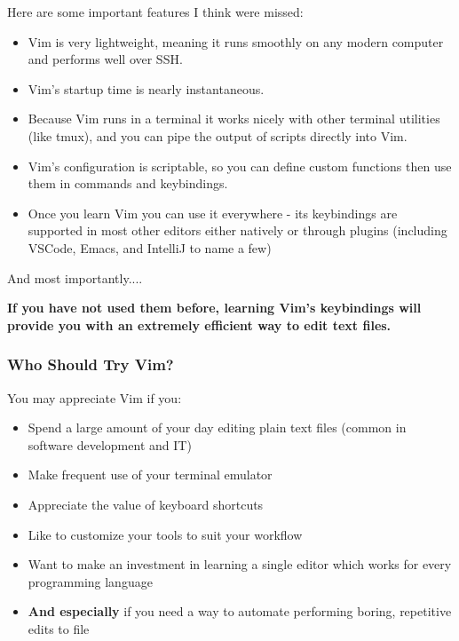 \documentclass{beamer}
\begin{document}
\begin{frame}[fragile]
    \centerline{\large Here are some important features I think were missed:}
    \vspace{0.5cm}
    \small
    \begin{itemize}
	\item Vim is very lightweight, meaning it runs smoothly on any modern computer and performs well over SSH.
	\item Vim's startup time is nearly instantaneous.
	\item Because Vim runs in a terminal it works nicely with other terminal utilities (like tmux), and you can pipe the output of scripts directly into Vim.
	\item Vim's configuration is scriptable, so you can define custom functions then use them in commands and keybindings.
	\item Once you learn Vim you can use it everywhere - its keybindings are supported in most other editors either natively or through plugins (including VSCode, Emacs, and IntelliJ to name a few)
    \end{itemize}
\end{frame}

\begin{frame}[fragile]
    \centerline{\large And most importantly....}
    \vspace{0.5cm}
    \small \textbf{If you have not used them before, learning Vim's keybindings will provide you with an extremely efficient way to edit text files.}\\
\end{frame}

\begin{frame}[fragile]
    \frametitle{Who Should Try Vim?}
    \centerline{\large You may appreciate Vim if you:}
    \vspace{0.5cm}
    \begin{itemize}
	\item Spend a large amount of your day editing plain text files (common in software development and IT)
	\item Make frequent use of your terminal emulator
	\item Appreciate the value of keyboard shortcuts
	\item Like to customize your tools to suit your workflow
	\item Want to make an investment in learning a single editor which works for every programming language
	\item \textbf{And especially} if you need a way to automate performing boring, repetitive edits to file
    \end{itemize}
\end{frame}
\end{document}
